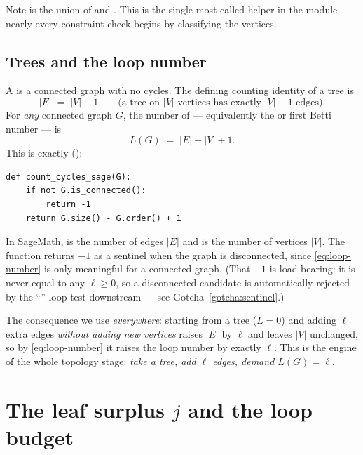 Note  is the union of  and .
This is the single most-called helper in the module --- nearly every constraint
check begins by classifying the vertices.

\subsection{Trees and the loop number}

A  is a connected graph with no cycles. The defining counting
identity of a tree is
\begin{equation}
  |E| \;=\; |V| - 1
  \qquad\text{(a tree on $|V|$ vertices has exactly $|V|-1$ edges).}
  \label{eq:tree-edges}
\end{equation}
For \emph{any} connected graph $G$, the number of  ---
equivalently the  or first Betti number --- is
\begin{equation}
  L(G) \;=\; |E| - |V| + 1.
  \label{eq:loop-number}
\end{equation}
This is exactly  ():

\begin{lstlisting}
def count_cycles_sage(G):
    if not G.is_connected():
        return -1
    return G.size() - G.order() + 1
\end{lstlisting}

In SageMath,  is the number of edges $|E|$ and  is
the number of vertices $|V|$. The function returns $-1$ as a sentinel when the
graph is disconnected, since \eqref{eq:loop-number} is only meaningful for a
connected graph. (That $-1$ is load-bearing: it is never equal to any $\ell\ge0$,
so a disconnected candidate is automatically rejected by the
``'' loop test downstream --- see Gotcha~\ref{gotcha:sentinel}.)

\begin{note}
The consequence we use \emph{everywhere}: starting from a tree ($L=0$) and adding
$\ell$ extra edges \emph{without adding new vertices} raises $|E|$ by $\ell$ and
leaves $|V|$ unchanged, so by \eqref{eq:loop-number} it raises the loop number by
exactly $\ell$. This is the engine of the whole topology stage: \emph{take a
tree, add $\ell$ edges, demand $L(G)=\ell$.}
\end{note}

\section{The leaf surplus \texorpdfstring{$j$}{j} and the loop budget}


